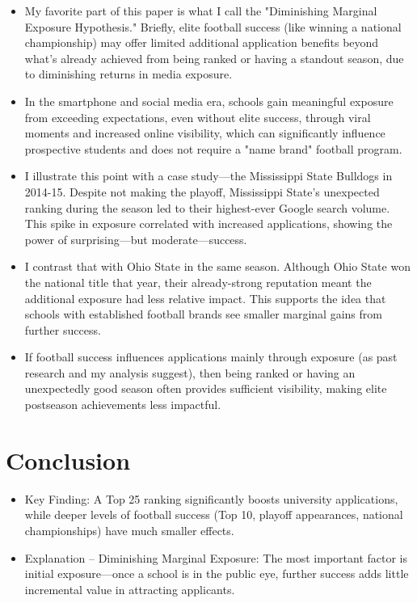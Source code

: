 \documentclass{article}
\begin{document}
\begin{itemize}
    \item My favorite part of this paper is what I call the "Diminishing Marginal Exposure Hypothesis." Briefly, elite football success (like winning a national championship) may offer limited additional application benefits beyond what’s already achieved from being ranked or having a standout season, due to diminishing returns in media exposure.

    \item In the smartphone and social media era, schools gain meaningful exposure from exceeding expectations, even without elite success, through viral moments and increased online visibility, which can significantly influence prospective students and does not require a "name brand" football program.

    \item I illustrate this point with a case study---the Mississippi State Bulldogs in 2014-15. Despite not making the playoff, Mississippi State's unexpected ranking during the season led to their highest-ever Google search volume. This spike in exposure correlated with increased applications, showing the power of surprising---but moderate---success.

    \item I contrast that with Ohio State in the same season. Although Ohio State won the national title that year, their already-strong reputation meant the additional exposure had less relative impact. This supports the idea that schools with established football brands see smaller marginal gains from further success.

    \item If football success influences applications mainly through exposure (as past research and my analysis suggest), then being ranked or having an unexpectedly good season often provides sufficient visibility, making elite postseason achievements less impactful.
    
\end{itemize}

\section{Conclusion}

\begin{itemize}
    \item Key Finding: A Top 25 ranking significantly boosts university applications, while deeper levels of football success (Top 10, playoff appearances, national championships) have much smaller effects.
    \item Explanation – Diminishing Marginal Exposure: The most important factor is initial exposure—once a school is in the public eye, further success adds little incremental value in attracting applicants.
\end{itemize}
\end{document}
